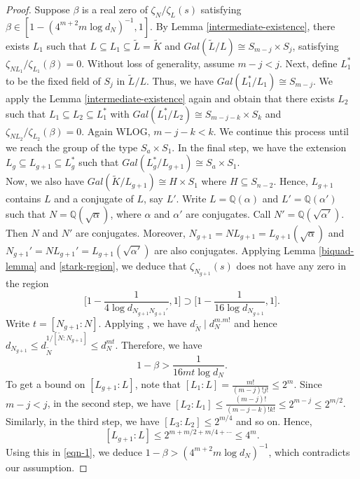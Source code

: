 \documentclass[12pt]{amsart}
\theoremstyle{definition}
\newcommand{\Q}{\mathbb{Q}}
\begin{document}
\begin{proof}
Suppose $\beta $ is a real zero of $\zeta_N/\zeta_L(s)$ satisfying $\beta \in [1-(4^{m+2} m\log d_N)^{-1}, 1]$. By Lemma \ref{intermediate-existence}, there exists $L_1$ such that $L\subseteq L_1 \subseteq \widetilde{L} = \widetilde{K}$ and $Gal(\widetilde{L}/L)\cong S_{m-j}\times S_j$, satisfying $\zeta_{NL_1}/\zeta_{L_1} (\beta)=0$. Without loss of generality, assume $m-j<j$. Next, define $L_1^*$ to be the fixed field of $S_j$ in $\widetilde{L}/L$. Thus, we have $Gal(L_1^*/L_1) \cong S_{m-j}$. We apply the Lemma \ref{intermediate-existence} again and obtain that there exists $L_2$ such that $L_1\subseteq L_2 \subseteq L_1^*$ with $Gal(L_1^*/L_2)\cong S_{m-j-k}\times S_k$ and $\zeta_{NL_2}/\zeta_{L_2} (\beta)=0$. Again WLOG, $m-j-k<k$. We continue this process until we reach the group of the type $S_a\times S_1$. In the final step, we have the extension $L_g\subseteq L_{g+1}\subseteq L_g^*$ such that $Gal(L_g^*/L_{g+1}) \cong S_a \times S_1$.\\

Now, we also have $Gal(\widetilde{K}/L_{g+1})\cong H \times S_1$ where $H\subseteq S_{n-2}$. Hence, $L_{g+1}$ contains $L$ and a conjugate of $L$, say $L'$. Write $L=\Q(\alpha)$ and $L'=\Q(\alpha')$ such that $N= \Q(\sqrt{\alpha})$, where $\alpha$ and $\alpha'$ are conjugates. Call $N'=\Q(\sqrt{\alpha'})$. Then $N$ and $N'$ are conjugates. Moreover, $N_{g+1}= NL_{g+1}= L_{g+1}(\sqrt{\alpha})$ and $N_{g+1}'= NL_{g+1}'= L_{g+1}(\sqrt{\alpha'})$ are also conjugates. Applying Lemma \ref{biquad-lemma} and \eqref{stark-region}, we deduce that $\zeta_{N_{g+1}}(s)$ does not have any zero in the region
\begin{equation*}
    \bigg[1-\frac{1}{4\log d_{N_{g+1}N_{g+1}'}},1\bigg] \supset \bigg[1-\frac{1}{16\log d_{N_{g+1}}},1\bigg].
\end{equation*}
Write $t=[N_{g+1}:N]$. Applying \cite[Lemma 7]{Stk}, we have $d_{\widetilde{N}} \mid d_N^{m.m!}$ and hence $d_{N_{g+1}} \leq d_{\tilde{N}}^{1/[\widetilde{N}:N_{g+1}]} \leq d_N^{mt}$. Therefore, we have
\begin{equation}\label{eqn-1}
    1-\beta > \frac{1}{16mt \log d_N}.
\end{equation}
To get a bound on $[L_{g+1}:L]$, note that $[L_1:L]= \frac{m!}{(m-j)! j!}\leq 2^m$. Since $m-j<j$, in the second step, we have $[L_2:L_1]\leq \frac{(m-j)!}{(m-j-k)! k!} \leq 2^{m-j}\leq 2^{m/2}$. Similarly, in the third step, we have $[L_3:L_2]\leq 2^{m/4}$ and so on. Hence, 
$$
[L_{g+1}:L] \leq 2^{m+m/2+m/4+\cdots}\leq 4^m.
$$
Using this in \eqref{eqn-1}, we deduce $1-\beta > (4^{m+2}m \log d_N)^{-1}$, which contradicts our assumption.


\end{proof}
\end{document}

